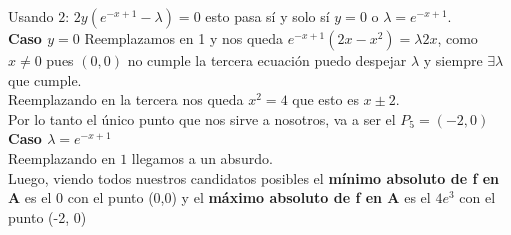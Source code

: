 \documentclass[10pt,a4paper]{article}
\begin{document}
Usando $2$: $2y(e^{-x+1}-\lambda) = 0$ esto pasa sí y solo sí $y = 0$ o $\lambda = e^{-x+1}$. \\
\textbf{Caso $y = 0$}
Reemplazamos en 1 y nos queda $e^{-x+1}(2x-x^{2}) = \lambda 2x$, como $x \neq 0$ pues $(0,0)$ no cumple la tercera ecuación puedo despejar $\lambda$ y siempre $\exists \lambda$ que cumple. \\
Reemplazando en la tercera nos queda $x^{2} = 4$ que esto es $x \pm 2$. \\
Por lo tanto el único punto que nos sirve a nosotros, va a ser el $P_{5} = (-2, 0)$ \\
\textbf{Caso $\lambda = e^{-x+1}$} \\
Reemplazando en $1$ llegamos a un absurdo. \\
Luego, viendo todos nuestros candidatos posibles el \textbf{mínimo absoluto de f en A} es el 0 con el punto (0,0) y el \textbf{máximo absoluto de f en A} es el $4e^{3}$ con el punto (-2, 0) 
\end{document}
